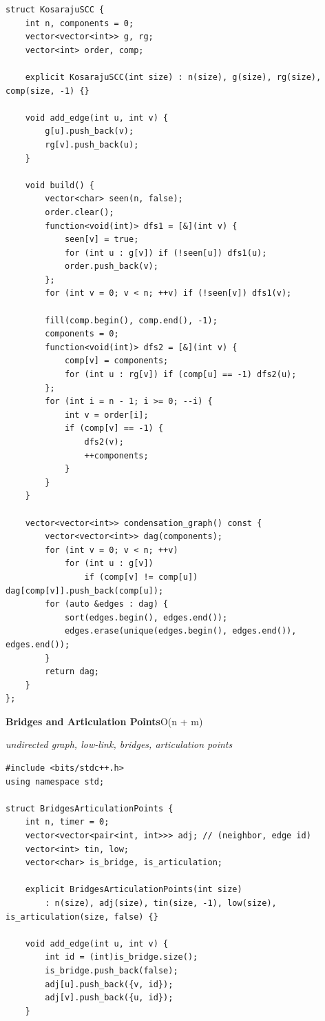 \documentclass[8pt,a4paper,landscape]{article}
\begin{document}
\begin{multicols}{3}
\begin{lstlisting}
struct KosarajuSCC {
    int n, components = 0;
    vector<vector<int>> g, rg;
    vector<int> order, comp;

    explicit KosarajuSCC(int size) : n(size), g(size), rg(size), comp(size, -1) {}

    void add_edge(int u, int v) {
        g[u].push_back(v);
        rg[v].push_back(u);
    }

    void build() {
        vector<char> seen(n, false);
        order.clear();
        function<void(int)> dfs1 = [&](int v) {
            seen[v] = true;
            for (int u : g[v]) if (!seen[u]) dfs1(u);
            order.push_back(v);
        };
        for (int v = 0; v < n; ++v) if (!seen[v]) dfs1(v);

        fill(comp.begin(), comp.end(), -1);
        components = 0;
        function<void(int)> dfs2 = [&](int v) {
            comp[v] = components;
            for (int u : rg[v]) if (comp[u] == -1) dfs2(u);
        };
        for (int i = n - 1; i >= 0; --i) {
            int v = order[i];
            if (comp[v] == -1) {
                dfs2(v);
                ++components;
            }
        }
    }

    vector<vector<int>> condensation_graph() const {
        vector<vector<int>> dag(components);
        for (int v = 0; v < n; ++v)
            for (int u : g[v])
                if (comp[v] != comp[u]) dag[comp[v]].push_back(comp[u]);
        for (auto &edges : dag) {
            sort(edges.begin(), edges.end());
            edges.erase(unique(edges.begin(), edges.end()), edges.end());
        }
        return dag;
    }
};
\end{lstlisting}
\vspace{1pt}
\textbf{Bridges and Articulation Points}\hfill{\scriptsize O(n + m)}\par
{\scriptsize\itshape undirected graph, low-link, bridges, articulation points}\par
\begin{lstlisting}
#include <bits/stdc++.h>
using namespace std;

struct BridgesArticulationPoints {
    int n, timer = 0;
    vector<vector<pair<int, int>>> adj; // (neighbor, edge id)
    vector<int> tin, low;
    vector<char> is_bridge, is_articulation;

    explicit BridgesArticulationPoints(int size)
        : n(size), adj(size), tin(size, -1), low(size), is_articulation(size, false) {}

    void add_edge(int u, int v) {
        int id = (int)is_bridge.size();
        is_bridge.push_back(false);
        adj[u].push_back({v, id});
        adj[v].push_back({u, id});
    }


\end{lstlisting}
\end{multicols}
\end{document}
